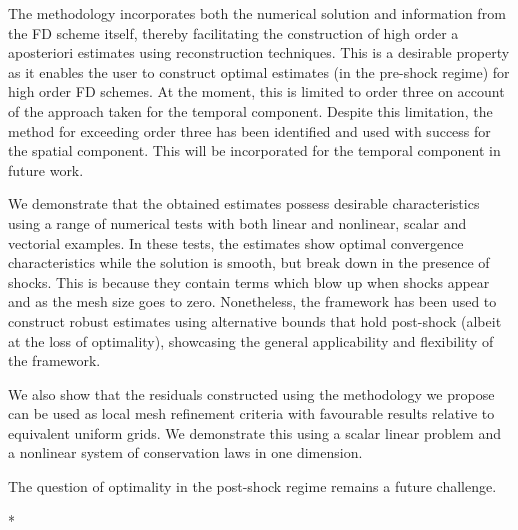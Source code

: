 \documentclass[final]{amsart}
\numberwithin{equation}{section}
\begin{document}
The methodology incorporates both the numerical solution and information from the FD scheme itself, thereby facilitating the construction of high order a aposteriori estimates using reconstruction techniques. This is  a desirable property as it enables the user to construct optimal estimates (in the pre-shock regime) for high order FD schemes.  
At the moment, this is limited to order three on account of the approach taken for the temporal component. Despite this limitation, the method for exceeding order three has been identified and used with success for the spatial component.  This will be incorporated for the temporal component  in future work.



We demonstrate that the  obtained estimates possess desirable characteristics using a range of numerical tests with both linear and nonlinear, scalar and vectorial examples.  In these tests, the estimates show optimal convergence characteristics while the solution is smooth, but break down in the presence of shocks.  This is because they contain terms which blow up when shocks appear and as the mesh size goes to zero.  Nonetheless, the framework has been used to construct robust estimates using alternative bounds that hold post-shock (albeit at the loss of optimality), showcasing the general applicability and flexibility of the framework.

We also show that the residuals constructed using the methodology we propose can be used as local mesh refinement criteria with favourable results relative to equivalent uniform grids.  We demonstrate this using a scalar linear problem and a nonlinear system of conservation laws in one dimension.

The question of optimality in the post-shock regime remains a future challenge.


 
  \/*
\end{document}
